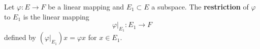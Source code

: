 Let $\varphi: E \to F$ be a linear mapping and $E_1 \subset E$ a subspace. The \textbf{restriction} of $\varphi$ to $E_1$ is the linear mapping
$$\varphi|_{E_1}: E_1 \to F$$
defined by $(\varphi|_{E_1})x = \varphi x$ for $x \in E_1$.
